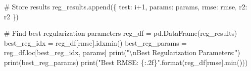 \documentclass[
  letterpaper,
  DIV=11,
  numbers=noendperiod]{scrreprt}
\newenvironment{Shaded}{\begin{snugshade}}{\end{snugshade}}
\newcommand{\BuiltInTok}[1]{\textcolor[rgb]{0.00,0.23,0.31}{#1}}
\newcommand{\CharTok}[1]{\textcolor[rgb]{0.13,0.47,0.30}{#1}}
\newcommand{\CommentTok}[1]{\textcolor[rgb]{0.37,0.37,0.37}{#1}}
\newcommand{\DecValTok}[1]{\textcolor[rgb]{0.68,0.00,0.00}{#1}}
\newcommand{\NormalTok}[1]{\textcolor[rgb]{0.00,0.23,0.31}{#1}}
\newcommand{\OperatorTok}[1]{\textcolor[rgb]{0.37,0.37,0.37}{#1}}
\newcommand{\SpecialCharTok}[1]{\textcolor[rgb]{0.37,0.37,0.37}{#1}}
\newcommand{\StringTok}[1]{\textcolor[rgb]{0.13,0.47,0.30}{#1}}
\begin{document}
\begin{Shaded}
\begin{Highlighting}[]
    \CommentTok{\# Store results}
\NormalTok{    reg\_results.append(\{}
        \StringTok{\textquotesingle{}test\textquotesingle{}}\NormalTok{: i}\OperatorTok{+}\DecValTok{1}\NormalTok{,}
        \StringTok{\textquotesingle{}params\textquotesingle{}}\NormalTok{: params,}
        \StringTok{\textquotesingle{}rmse\textquotesingle{}}\NormalTok{: rmse,}
        \StringTok{\textquotesingle{}r2\textquotesingle{}}\NormalTok{: r2}
\NormalTok{    \})}

\CommentTok{\# Find best regularization parameters}
\NormalTok{reg\_df }\OperatorTok{=}\NormalTok{ pd.DataFrame(reg\_results)}
\NormalTok{best\_reg\_idx }\OperatorTok{=}\NormalTok{ reg\_df[}\StringTok{\textquotesingle{}rmse\textquotesingle{}}\NormalTok{].idxmin()}
\NormalTok{best\_reg\_params }\OperatorTok{=}\NormalTok{ reg\_df.loc[best\_reg\_idx, }\StringTok{\textquotesingle{}params\textquotesingle{}}\NormalTok{]}
\BuiltInTok{print}\NormalTok{(}\StringTok{"}\CharTok{\textbackslash{}n}\StringTok{Best Regularization Parameters:"}\NormalTok{)}
\BuiltInTok{print}\NormalTok{(best\_reg\_params)}
\BuiltInTok{print}\NormalTok{(}\StringTok{"Best RMSE: }\SpecialCharTok{\{:.2f\}}\StringTok{"}\NormalTok{.}\BuiltInTok{format}\NormalTok{(reg\_df[}\StringTok{\textquotesingle{}rmse\textquotesingle{}}\NormalTok{].}\BuiltInTok{min}\NormalTok{()))}
\end{Highlighting}
\end{Shaded}
\end{document}
